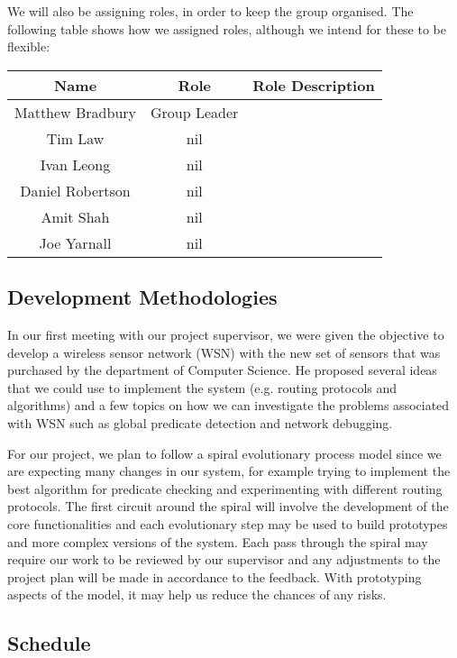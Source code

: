 \documentclass[a4paper]{article}
\begin{document}
We will also be assigning roles, in order to keep the group organised. The following table shows how we assigned roles, although we intend for these to be flexible:

\begin{table}[H]
\centering
	\begin{tabular}{| c | c | c |}
		\hline
		Name & Role & Role Description\\
		\hline
		Matthew Bradbury & Group Leader & ~ \\
		Tim Law & nil & ~ \\
		Ivan Leong & nil & ~ \\
		Daniel Robertson & nil & ~ \\
		Amit Shah & nil & ~ \\
		Joe Yarnall & nil & ~ \\
		\hline
	\end{tabular}
\end{table}



\subsection{Development Methodologies}
In our first meeting with our project supervisor, we were given the objective to develop a wireless sensor network (WSN) with the new set of sensors that was purchased by the department of Computer Science. He proposed several ideas that we could use to implement the system (e.g. routing protocols and algorithms) and a few topics on how we can investigate the problems associated with WSN such as global predicate detection and network debugging. 

For our project, we plan to follow a spiral evolutionary process model since we are expecting many changes in our system, for example trying to implement the best algorithm for predicate checking and experimenting with different routing protocols. The first circuit around the spiral will involve the development of the core functionalities and each evolutionary step may be used to build prototypes and more complex versions of the system. Each pass through the spiral may require our work to be reviewed by our supervisor and any adjustments to the project plan will be made in accordance to the feedback. With prototyping aspects of the model, it may help us reduce the chances of any risks.



\subsection{Schedule}
\end{document}
